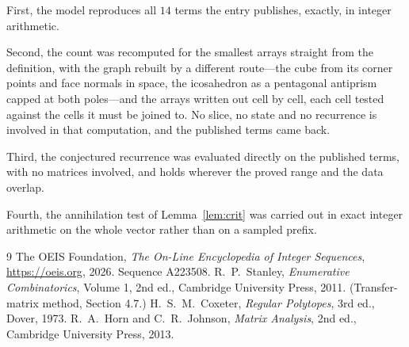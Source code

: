 \documentclass[11pt,a4paper]{article}
\theoremstyle{plain}
\theoremstyle{definition}
\begin{document}
First, the model reproduces all $14$ terms the entry publishes, exactly, in integer
arithmetic.

Second, the count was recomputed for the smallest arrays straight from the definition, with the
graph rebuilt by a different route---the cube from its corner points and face normals in space,
the icosahedron as a pentagonal antiprism capped at both poles---and the arrays written out cell
by cell, each cell tested against the cells it must be joined to. No slice, no state and no
recurrence is involved in that computation, and the published terms came back.

Third, the conjectured recurrence was evaluated directly on the published terms, with no
matrices involved, and holds wherever the proved range and the data overlap.

Fourth, the annihilation test of Lemma~\ref{lem:crit} was carried out in exact integer
arithmetic on the whole vector rather than on a sampled prefix.

\begin{thebibliography}{9}
 The OEIS Foundation, \emph{The On-Line Encyclopedia of Integer
Sequences}, \url{https://oeis.org}, 2026. Sequence A223508.
 R.~P.~Stanley, \emph{Enumerative Combinatorics}, Volume 1, 2nd ed.,
Cambridge University Press, 2011. (Transfer-matrix method, Section 4.7.)
 H.~S.~M.~Coxeter, \emph{Regular Polytopes}, 3rd ed., Dover, 1973.
 R.~A.~Horn and C.~R.~Johnson, \emph{Matrix Analysis}, 2nd ed., Cambridge
University Press, 2013.
\end{thebibliography}
\end{document}
